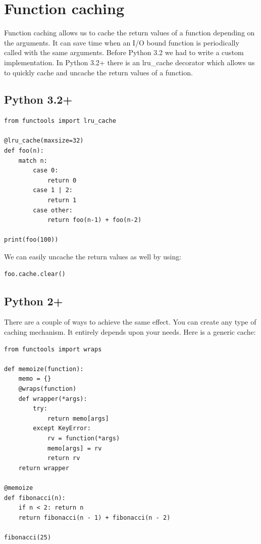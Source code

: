 \documentclass{report}
\begin{document}
    \pagebreak \bigbreak \noindent \section{Function caching}
    \bigbreak \noindent 
    Function caching allows us to cache the return values of a function depending on the arguments. It can save time when an I/O bound function is periodically called with the same arguments. Before Python 3.2 we had to write a custom implementation. In Python 3.2+ there is an lru\_cache decorator which allows us to quickly cache and uncache the return values of a function.
    \subsection{Python 3.2+}
    \bigbreak \noindent 
    \begin{mdframed}
        \begin{verbatim}
from functools import lru_cache

@lru_cache(maxsize=32)
def foo(n):
    match n:
        case 0:
            return 0
        case 1 | 2:
            return 1
        case other:
            return foo(n-1) + foo(n-2)

print(foo(100))
        \end{verbatim}
    \end{mdframed}
    \bigbreak \noindent 
    \bigbreak \noindent 
    We can easily uncache the return values as well by using:
    \begin{verbatim}
foo.cache.clear()
    \end{verbatim}
    \bigbreak \noindent 
    \subsection{Python 2+}
    \bigbreak \noindent 
    There are a couple of ways to achieve the same effect. You can create any type of caching mechanism. It entirely depends upon your needs. Here is a generic cache:
    \bigbreak \noindent 
    \begin{mdframed}
        \begin{verbatim}
from functools import wraps

def memoize(function):
    memo = {}
    @wraps(function)
    def wrapper(*args):
        try:
            return memo[args]
        except KeyError:
            rv = function(*args)
            memo[args] = rv
            return rv
    return wrapper

@memoize
def fibonacci(n):
    if n < 2: return n
    return fibonacci(n - 1) + fibonacci(n - 2)

fibonacci(25)
        \end{verbatim}
    \end{mdframed}
    \bigbreak \noindent 
    \bigbreak \noindent 
\end{document}

